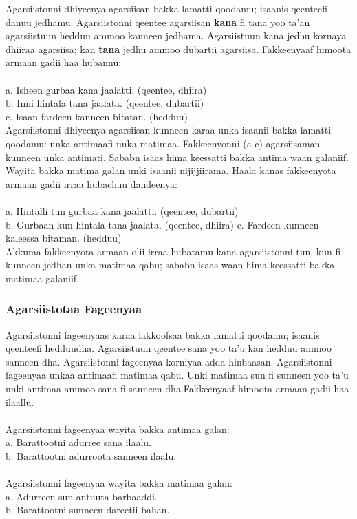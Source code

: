 \documentclass[11pt,b5paper]{book}
\begin{document}
Agarsiistonni dhiyeenya agarsiisan bakka lamatti qoodamu; isaanis qeenteefi danuu jedhamu. Agarsiistonni qeentee
agarsiisan \textbf{kana} fi tana yoo ta'an agarsiistuun hedduu ammoo kanneen jedhama. Agarsiistuun kana jedhu kornaya dhiiraa agarsiisa; kan \textbf{tana} jedhu ammoo dubartii agarsiisa. Fakkeenyaaf himoota armaan gadii haa hubannu: \\
\\
a. Isheen gurbaa kana jaalatti. (qeentee, dhiira)\\
b. Inni hintala tana jaalata. (qeentee, dubartii)\\
c. Isaan fardeen kanneen bitatan. (hedduu) \\

Agarsiistonni dhiyeenya agarsiisan kunneen karaa unka isaanii bakka lamatti qoodamu: unka antimaafi unka matimaa.
Fakkeenyonni (a-c) agarsiisaman kunneen unka antimati. Sababn isaas hima keessatti bakka antima waan galaniif.
Wayita bakka matima galan unki isaanii nijijjiirama. Haala kanas fakkeenyota armaan gadii irraa hubachuu dandeenya: \\
\\
a. Hintalli tun gurbaa kana jaalatti. (qeentee, dubartii)\\
b. Gurbaan kun hintala tana jaalata. (qeentee, dhiira)
c. Fardeen kunneen kaleessa bitaman. (hedduu)\\

Akkuma fakkeenyota armaan olii irraa hubatamu kana agarsiistonni tun, kun fi kunneen jedhan unka matimaa qabu;
sababn isaas waan hima keessatti bakka matimaa galaniif. 

\subsubsection{ Agarsiistotaa Fageenyaa}

Agarsiistonni fageenyaas karaa lakkoofsaa bakka lamatti qoodamu; isaanis qeenteefi hedduudha. Agarsiistuun qeentee
sana yoo ta'u kan hedduu ammoo sanneen dha. Agarsiistonni fageenyaa korniyaa adda hinbaasan. Agarsiistonni fageenyaa unkaa antimaafi matimaa qabu. Unki matimaa sun fi sunneen yoo ta'u unki antimaa ammoo sana fi sanneen dha.Fakkeenyaaf himoota armaan gadii haa ilaallu.\\
\\
Agarsiistonni fageenyaa wayita bakka antimaa galan:\\
a. Barattootni adurree sana ilaalu.\\
b. Barattootni adurroota sanneen ilaalu.\\
\\
Agarsiistonni fageenyaa wayita bakka matimaa galan:\\
a. Adurreen sun antuuta barbaaddi.\\
b. Barattootni sunneen dareetii bahan. \\
\end{document}
